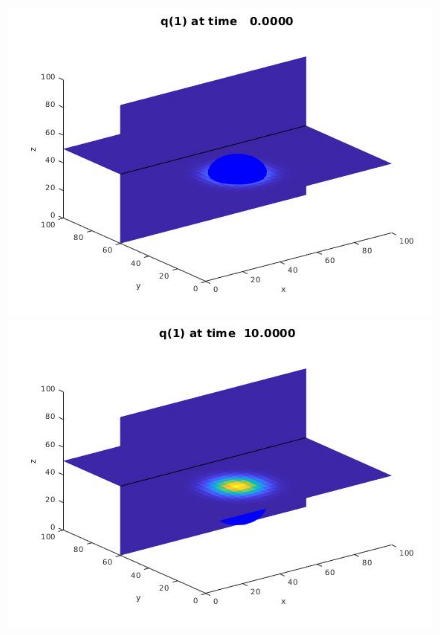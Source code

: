 \begin{frame}
	\scriptsize
		\begin{figure}[H]
			\centering
			\begin{minipage}{0.4\textwidth}
				\includegraphics[scale=0.26]{Bilder_3D/Example_1Glocke_t=0_T22}
			\end{minipage}
			\hfill 
			\begin{minipage}{0.4\textwidth}
				\includegraphics[scale=0.26]{Bilder_3D/Example_1Glocke_t=10_T22}
			\end{minipage}
		\end{figure}
		\begin{figure}[H]
			\centering
			\begin{minipage}{0.4\textwidth}

\end{minipage}
\end{figure}
\end{frame}
